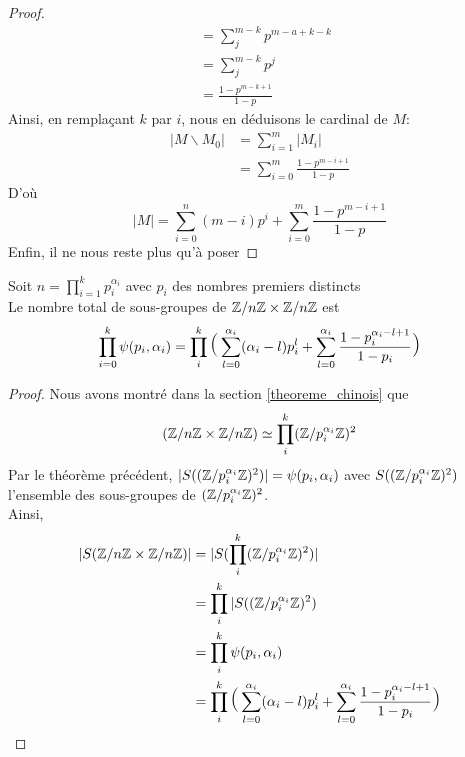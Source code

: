 \documentclass[12pt]{article}
\begin{document}
\begin{proof}
\begin{equation*}
\begin{split}
			&= \sum_{j}^{m - k}p^{m - a + k - k}\\
			&= \sum_{j}^{m - k}p^{j}\\
			&= \frac{1 - p^{m-k+1}}{1-p}
		\end{split}
	\end{equation*}
	Ainsi, en remplaçant $k$ par $i$, nous en déduisons le cardinal de $M$:
	\begin{equation*}
		\begin{split}
			|M \backslash M_0| &= \sum_{i=1}^{m}|M_i|\\
			&= \sum_{i=0}^{m}\frac{1 - p^{m-i+1}}{1-p}
		\end{split}
	\end{equation*}
	D'où
	$$|M| = \sum_{i=0}^{n}(m-i)p^i + \sum_{i = 0}^{m}\frac{1- p^{m-i+1}}{1 - p}$$
	Enfin, il ne nous reste plus qu'à poser
\end{proof}

\newpage
\begin{proposition}
	Soit $n = \prod\limits_{i = 1}^k p_i^{\alpha_i}$ avec $p_i$ des nombres premiers distincts\\
	Le nombre total de sous-groupes de $\mathbb Z/n\mathbb Z \times \mathbb Z/n\mathbb Z$ est
	$$\prod_{i = 0}^{k} \psi(p_i,\alpha_i)
		= \prod_i^k\mlarge[3](\sum_{l=0}^{\alpha_i}(\alpha_i-l)p_i^l +%
		\sum_{l = 0}^{\alpha_i}\frac{1- p_i^{\alpha_i-l+1}}{1 - p_i}\mlarge[3])$$
\end{proposition}

\begin{proof}
	Nous avons montré dans la section \ref{theoreme_chinois} que
	$$(\mathbb Z/n\mathbb Z \times \mathbb Z/n\mathbb Z) \simeq \prod_i^k(\mathbb Z/p_i^{\alpha_i}\mathbb Z)^2$$
	Par le théorème précédent, $|S((\mathbb Z/p_i^{\alpha_i}\mathbb Z)^2)| = \psi(p_i, \alpha_i)$ avec
	$S((\mathbb Z/p_i^{\alpha_i}\mathbb Z)^2)$ l'ensemble des sous-groupes de $(\mathbb Z/p_i^{\alpha_i}\mathbb Z)^2$.\\
	Ainsi,
	\begin{equation*}
		\begin{split}
			|S(\ZZ)| &= |S(\prod_i^k(\Z/p_i^{\alpha_i}\Z)^2)|\\
			&= \prod_i^k|S((\Z/p_i^{\alpha_i}\Z)^2)\\
			&= \prod_i^k\psi(p_i,\alpha_i)\\
			&= \prod_i^k\mlarge[3](\sum_{l=0}^{\alpha_i}(\alpha_i-l)p_i^l +%
			\sum_{l = 0}^{\alpha_i}\frac{1- p_i^{\alpha_i-l+1}}{1 - p_i}\mlarge[3])
		\end{split}
	\end{equation*}
\end{proof}
\end{document}
